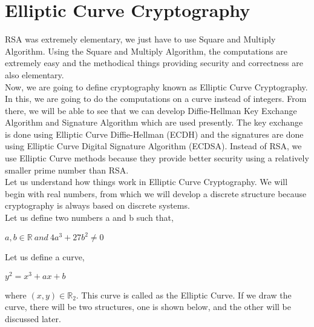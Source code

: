 \documentclass[11pt]{article}
\begin{document}
\section{Elliptic Curve Cryptography}
RSA was extremely elementary, we just have to use Square and Multiply Algorithm. Using the Square and Multiply Algorithm, the computations are extremely easy and the methodical things providing security and correctness are also elementary.\\
\newline
Now, we are going to define cryptography known as Elliptic Curve Cryptography. In this, we are going to do the computations on a curve instead of integers. From there, we will be able to see that we can develop Diffie-Hellman Key Exchange Algorithm and Signature Algorithm which are used presently. The key exchange is done using Elliptic Curve Diffie-Hellman (ECDH) and the signatures are done using Elliptic Curve Digital Signature Algorithm (ECDSA). Instead of RSA, we use Elliptic Curve methods because they provide better security using a relatively smaller prime number than RSA.\\
\newline
Let us understand how things work in Elliptic Curve Cryptography. We will begin with real numbers, from which we will develop a discrete structure because cryptography is always based on discrete systems.\\
\newline
Let us define two numbers a and b such that,
\begin{center}
    $a, b \in \mathbb{R} \ and \ 4a^3 + 27b^2 \neq 0$
\end{center}
Let us define a curve,
\begin{center}
    $y^2 = x^3 + ax + b$
\end{center}
where $(x,y) \in \mathbb{R}_2$. This curve is called as the Elliptic Curve. If we draw the curve, there will be two structures, one is shown below, and the other will be discussed later.
\end{document}
